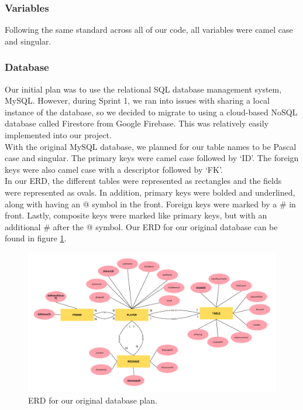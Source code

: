 \subsubsection{Variables}
Following the same standard across all of our code, all variables were camel case and singular. 

\subsubsection{Database}
\label{sec:database}
\noindent Our initial plan was to use the relational SQL database management system, MySQL. However, during Sprint 1, we ran into issues with sharing a local instance of the database, so we decided to migrate to using a cloud-based NoSQL database called Firestore from Google Firebase. This was relatively easily implemented into our project.\\

\noindent With the original MySQL database, we planned for our table names to be Pascal case and singular. The primary keys were camel case followed by `ID'. The foreign keys were also camel case with a descriptor followed by `FK'.\\

\noindent In our ERD, the different tables were represented as rectangles and the fields were represented as ovals. In addition, primary keys were bolded and underlined, along with having an @ symbol in the front. Foreign keys were marked by a \# in front. Lastly, composite keys were marked like primary keys, but with an additional \# after the @ symbol. Our ERD for our original database can be found in figure \ref{fig: original ERD}. \\

\begin{figure}[hbt!]
    \centering
    \includegraphics[width=1.0\linewidth]{figures/SE Database ERD.pdf}
    \caption{ERD for our original database plan.}
    \label{fig: original ERD}
\end{figure} 

